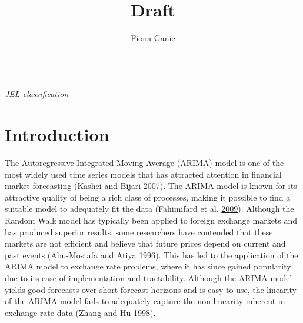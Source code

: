 \documentclass[12pt,preprint, authoryear]{elsarticle}
\numberwithin{equation}{section}
\numberwithin{figure}{section}
\numberwithin{table}{section}
\begin{document}
\begin{frontmatter}  %

\title{Draft}

\author[Add1]{Fiona Ganie}





\address[Add1]{University of Cape Town}



\vspace{1cm}

\begin{keyword}
\footnotesize{
 \\ \vspace{0.3cm}
\textit{JEL classification} 
}
\end{keyword}
\vspace{0.5cm}
\end{frontmatter}



\pagestyle{fancy}
\chead{}
\rhead{}
\lfoot{}
\lhead{}
\cfoot{}


\headsep 35pt %




\section{\texorpdfstring{Introduction
\label{Introduction}}{Introduction }}\label{introduction}

The Autoregressive Integrated Moving Average (ARIMA) model is one of the
most widely used time series models that has attracted attention in
financial market forecasting (Kashei and Bijari 2007). The ARIMA model
is known for its attractive quality of being a rich class of processes,
making it possible to find a suitable model to adequately fit the data
(Fahimifard et al. \protect\hyperlink{ref-fahimifard2009}{2009}).
Although the Random Walk model has typically been applied to foreign
exchange markets and has produced superior results, some researchers
have contended that these markets are not efficient and believe that
future prices depend on current and past events (Abu-Mostafa and Atiya
\protect\hyperlink{ref-abu1996}{1996}). This has led to the application
of the ARIMA model to exchange rate problems, where it has since gained
popularity due to its ease of implementation and tractability. Although
the ARIMA model yields good forecasts over short forecast horizons and
is easy to use, the linearity of the ARIMA model fails to adequately
capture the non-linearity inherent in exchange rate data (Zhang and Hu
\protect\hyperlink{ref-zhang1998}{1998}).
\end{document}
